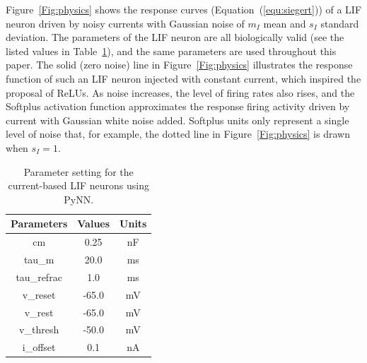 \documentclass[runningheads,a4paper]{llncs}
\begin{document}
Figure~\ref{Fig:physics} shows the response curves (Equation~(\ref{equ:siegert})) of a LIF neuron driven by noisy currents with Gaussian noise of $m_I$ mean and $s_I$ standard deviation.
The parameters of the LIF neuron are all biologically valid (see the listed values in Table~\ref{tbl:pynnConfig}), and the same parameters are used throughout this paper.
The solid (zero noise) line in Figure~\ref{Fig:physics} illustrates the response function of such an LIF neuron injected with constant current, which inspired the proposal of ReLUs.
As noise increases, the level of firing rates also rises, and the Softplus activation function approximates the response firing activity driven by current with Gaussian white noise added.
Softplus units only represent a single level of noise that, for example, the dotted line in Figure~\ref{Fig:physics} is drawn when $s_I=1$.

\begin{table}[bt]
	\centering
	\caption{\label{tbl:pynnConfig}Parameter setting for the current-based LIF neurons using PyNN.}
	\bgroup
	\def\arraystretch{1.4}
	\begin{tabular}{c c c}
		Parameters & Values & Units \\
		\hline
		cm & 0.25 & nF	\\
		tau\_m & 20.0 & ms\\
		tau\_refrac & 1.0 & ms\\
		v\_reset & -65.0 & mV\\
		v\_rest & -65.0 & mV\\
		v\_thresh & -50.0 & mV\\
		i\_offset & 0.1 & nA\\
		\hline
	\end{tabular}
	\egroup
\end{table}
\end{document}
